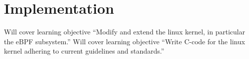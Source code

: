 \section{Implementation}
\label{sec:implementation}

Will cover learning objective ``Modify and extend the linux kernel, in particular the eBPF subsystem.''
Will cover learning objective ``Write C-code for the linux kernel adhering to current guidelines and standards.''













\appendix

